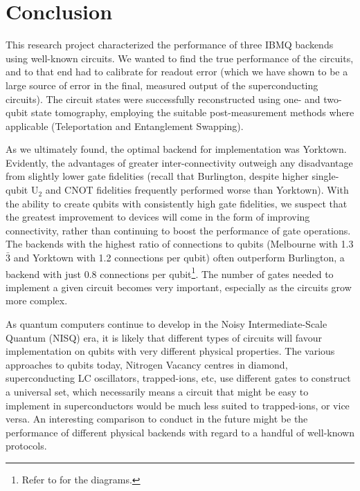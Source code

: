 \section{Conclusion}

This research project characterized the performance of three IBMQ backends using
well-known circuits. We wanted to find the true performance of the circuits, and
to that end had to calibrate for readout error (which we have shown to be a
large source of error in the final, measured output of the superconducting
circuits). The circuit states were successfully reconstructed using one- and
two-qubit state tomography, employing the suitable post-measurement methods
where applicable (Teleportation and Entanglement Swapping).

As we ultimately found, the optimal backend for implementation was Yorktown.
Evidently, the advantages of greater inter-connectivity outweigh any
disadvantage from slightly lower gate fidelities (recall that Burlington,
despite higher single-qubit U$_2$ and CNOT fidelities frequently performed worse
than Yorktown). With the ability to create qubits with consistently high gate
fidelities, we suspect that the greatest improvement to devices will come in the
form of improving connectivity, rather than continuing to boost the performance
of gate operations. The backends with the highest ratio of connections to qubits
(Melbourne with 1.3$\bar{3}$ and Yorktown with 1.2 connections per qubit) often
outperform Burlington, a backend with just 0.8 connections per
qubit\footnote{Refer to  for the diagrams.}. The number
of gates needed to implement a given circuit becomes very important, especially
as the circuits grow more complex.

As quantum computers continue to develop in the Noisy Intermediate-Scale Quantum
(NISQ) era, it is likely that different types of circuits will favour
implementation on qubits with very different physical properties. The various
approaches to qubits today, Nitrogen Vacancy centres in diamond, superconducting
LC oscillators, trapped-ions, etc, use different gates to construct a universal set,
which necessarily means a circuit that might be easy to implement in
superconductors would be much less suited to trapped-ions, or vice versa. An
interesting comparison to conduct in the future might be the performance of different
physical backends with regard to a handful of well-known protocols.

\newpage


